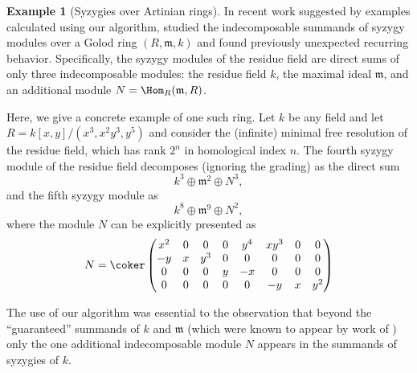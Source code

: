 \documentclass[12pt]{amsart}
\def\m{\mathfrak m}
\theoremstyle{theorem}
\numberwithin{thm}{section}
\theoremstyle{definition}
\newtheorem{exa}[thm]{Example}
\newcommand{\mahrud}[1]{{\color{ForestGreen} \sf $\blacklozenge$ Mahrud: [#1]}}
\begin{document}
\begin{exa}[Syzygies over Artinian rings]
  In recent work suggested by examples calculated using our algorithm, \cite{CDE24} studied the indecomposable summands of syzygy modules over a Golod ring $(R,\m,k)$ and found previously unexpected recurring behavior. Specifically, the syzygy modules of the residue field are direct sums of only three indecomposable modules: the residue field $k$, the maximal ideal $\m$, and an additional module $N = \Hom_R(\m, R)$.

  Here, we give a concrete example of one such ring. Let $k$ be any field and let $R = k[x,y]/(x^3,x^2y^3,y^5)$ and consider the (infinite) minimal free resolution of the residue field, which has rank $2^n$ in homological index $n$.   The fourth syzygy module of the residue field decomposes (ignoring the grading) as the direct sum
  $$ k^3 \oplus \m^2 \oplus N^3, $$
  and the fifth syzygy module as
  $$ k^8\oplus \m^9 \oplus N^2, $$
  where the module $N$ can be explicitly presented as
  \[ N = \coker
  \begin{pmatrix}
    x^{2}&0&0&0&y^{4}&xy^{3}&0&0\\
    -y&x&y^{3}&0&0&0&0&0\\
    0&0&0&y&-x&0&0&0\\
    0&0&0&0&0&-y&x&y^{2}
  \end{pmatrix} \]

  The use of our algorithm was essential to the observation that beyond the ``guaranteed'' summands of $k$ and $\m$ (which were known to appear by work of \cite{DE23}) only the one additional indecomposable module $N$ appears in the summands of syzygies of $k$.
\end{exa}

\end{document}
